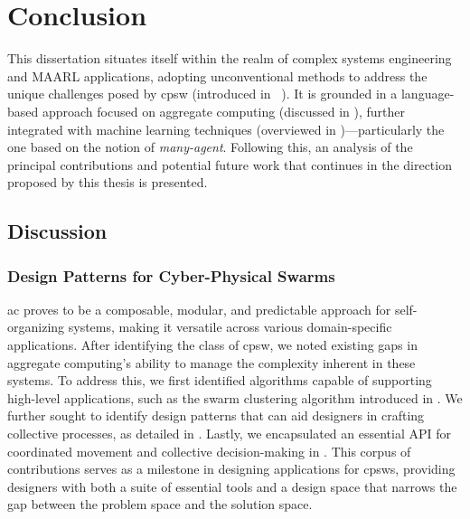 \chapter{Conclusion}\label{chap:wrap-up}%
This dissertation situates itself within the realm of complex systems engineering and \acf{MAARL} applications, 
 adopting unconventional methods to address the unique challenges posed by \acf{cpsw} (introduced in ~). 
 It is grounded in a language-based approach focused on aggregate computing (discussed in ), 
 further integrated with machine learning techniques (overviewed in )---particularly the one based on the notion of \emph{many-agent}. 
 Following this, 
 an analysis of the principal contributions 
 and potential future work that continues in the direction proposed by this thesis is presented.
\section{Discussion}
\subsection*{Design Patterns for Cyber-Physical Swarms}
\ac{ac} proves to be a composable, 
 modular, and predictable approach for self-organizing systems, 
 making it versatile across various domain-specific applications.
% 
After identifying the class of \ac{cpsw}, 
 we noted existing gaps in aggregate computing's ability to manage the complexity inherent in these systems. 
 To address this, we first identified algorithms capable of supporting high-level applications, 
 such as the swarm clustering algorithm introduced in . 
% 
We further sought to identify design patterns that can aid designers in crafting collective processes, 
 as detailed in . 
 Lastly, we encapsulated an essential API for coordinated movement and collective decision-making in . 
%
This corpus of contributions serves as a milestone in designing applications for \acp{cpsw}, 
 providing designers with both a suite of essential tools and a design space that narrows the gap between the problem space and the solution space.
